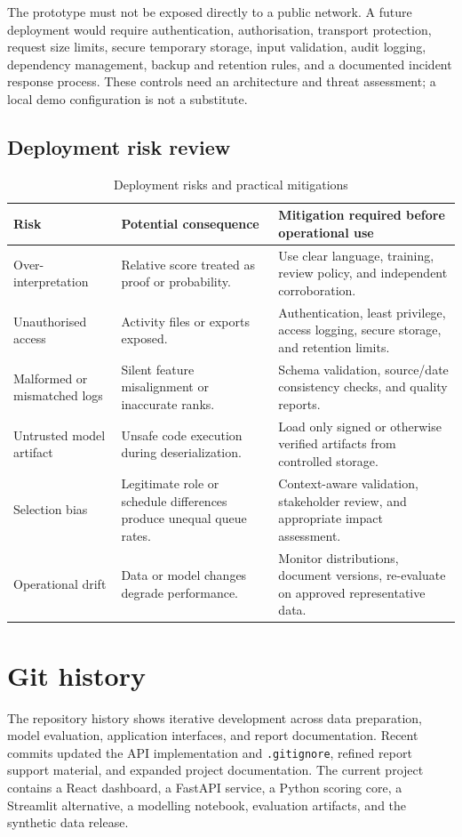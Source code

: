 \documentclass[12pt,a4paper,oneside]{report}
\newcommand{\tablefont}{\small}
\newcommand{\code}[1]{\texttt{\small #1}}
\begin{document}
The prototype must not be exposed directly to a public network. A
future deployment would require authentication, authorisation,
transport protection, request size limits, secure temporary storage,
input validation, audit logging, dependency management, backup and
retention rules, and a documented incident response process. These
controls need an architecture and threat assessment; a local demo
configuration is not a substitute.

\section{Deployment risk review}
\begin{table}[H]
\centering
\tablefont
\caption{Deployment risks and practical mitigations}
\label{tab:deployment-risks}
\begin{tabularx}{\textwidth}{|p{}|p{}|Y|}
\hline
\textbf{Risk} & \textbf{Potential consequence} & \textbf{Mitigation required before operational use}\\\hline
Over-interpretation & Relative score treated as proof or probability. & Use clear language, training, review policy, and independent corroboration.\\\hline
Unauthorised access & Activity files or exports exposed. & Authentication, least privilege, access logging, secure storage, and retention limits.\\\hline
Malformed or mismatched logs & Silent feature misalignment or inaccurate ranks. & Schema validation, source/date consistency checks, and quality reports.\\\hline
Untrusted model artifact & Unsafe code execution during deserialization. & Load only signed or otherwise verified artifacts from controlled storage.\\\hline
Selection bias & Legitimate role or schedule differences produce unequal queue rates. & Context-aware validation, stakeholder review, and appropriate impact assessment.\\\hline
Operational drift & Data or model changes degrade performance. & Monitor distributions, document versions, re-evaluate on approved representative data.\\\hline
\end{tabularx}
\end{table}

\chapter{Git history}
\label{chap:git}
The repository history shows iterative development across data
preparation, model evaluation, application interfaces, and report
documentation. Recent commits updated the API implementation and
\code{.gitignore}, refined report support material, and expanded
project documentation. The current project contains a React
dashboard, a FastAPI service, a Python scoring core, a Streamlit
alternative, a modelling notebook, evaluation artifacts, and the
synthetic data release.
\end{document}
